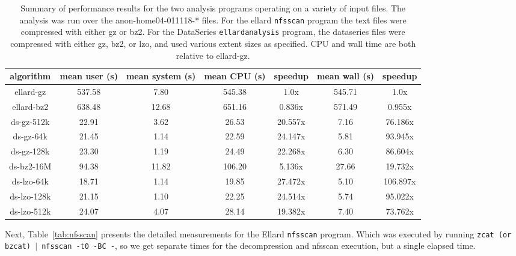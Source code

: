 \documentclass{article}
\begin{document}
\begin{table}
\begin{tabular}{|c|c|c|c|c|c|c|} \hline
algorithm   & mean user (s) & mean system (s) & mean CPU (s) & speedup & mean wall (s)& speedup  \\ \hline
ellard-gz   & 537.58    &  7.80       & 545.38   &  1.0x   & 545.71    &   1.0x   \\
ellard-bz2  & 638.48    & 12.68       & 651.16   &  0.836x & 571.49    &   0.955x \\
ds-gz-512k  &  22.91    &  3.62       &  26.53   & 20.557x &   7.16    &  76.186x \\
ds-gz-64k   &  21.45    &  1.14       &  22.59   & 24.147x &   5.81    &  93.945x \\
ds-gz-128k  &  23.30    &  1.19       &  24.49   & 22.268x &   6.30    &  86.604x \\
ds-bz2-16M  &  94.38    & 11.82       & 106.20   &  5.136x &  27.66    &  19.732x \\
ds-lzo-64k  &  18.71    &  1.14       &  19.85   & 27.472x &   5.10    & 106.897x \\
ds-lzo-128k &  21.15    &  1.10       &  22.25   & 24.514x &   5.74    &  95.022x \\
ds-lzo-512k &  24.07    &  4.07       &  28.14   & 19.382x &   7.40    &  73.762x \\ \hline
\end{tabular}
\label{tab:summary}

\caption{Summary of performance results for the two analysis programs
operating on a variety of input files.  The analysis was run over the
anon-home04-011118-* files.  For the ellard \texttt{nfsscan} program
the text files were compressed with either gz or bz2.  For the
DataSeries \texttt{ellardanalysis} program, the dataseries files were
compressed with either gz, bz2, or lzo, and used various extent sizes
as specified.  CPU and wall time are both relative to ellard-gz.}

\end{table}

Next, Table~\ref{tab:nfsscan} presents the detailed measurements for
the Ellard \texttt{nfsscan} program.  Which was executed by running
\texttt{zcat (or bzcat) $|$ nfsscan -t0 -BC -}, so we get separate
times for the decompression and nfsscan execution, but a single
elapsed time.
\end{document}
